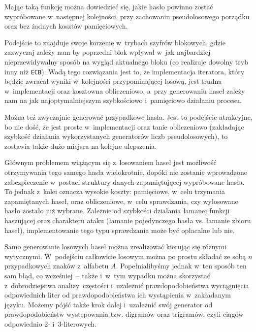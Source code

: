 \begin{myenumerate}
    Mając taką funkcję można dowiedzieć się, jakie hasło powinno zostać
    wypróbowane w~następnej kolejności, przy zachowaniu pseudolosowego porządku
    oraz bez żadnych kosztów pamięciowych.

    Podejście to znajduje swoje korzenie w~trybach szyfrów blokowych, gdzie
    zazwyczaj zależy nam by poprzedni blok wpływał w~jak najbardziej
    nieprzewidywalny sposób na wygląd aktualnego bloku (co realizuje dowolny
    tryb inny niż \texttt{ECB}). Wadą tego rozwiązania jest to, że
    implementacja iteratora, który będzie zwracał wyniki w~kolejności
    przypominającej losową, jest trudna w~implementacji oraz kosztowna
    obliczeniowo, a~przy generowaniu haseł zależy nam na jak najoptymalniejszym
    szybkościowo i~pamięciowo działaniu procesu.

    \item Można też zwyczajnie generować przypadkowe hasła. Jest to podejście
    atrakcyjne, bo nie dość, że jest proste w~implementacji oraz tanie
    obliczeniowo (zakładając szybkość działania wykorzystanych generatorów
    liczb pseudolosowych), to zostawia także dużo miejsca na kolejne
    ulepszenia.

    Głównym problemem wiążącym się z~losowaniem haseł jest możliwość
    otrzymywania tego samego hasła wielokrotnie, dopóki nie zostanie
    wprowadzone zabezpieczenie w~postaci struktury danych zapamiętującej
    wypróbowane hasła. To jednak z~kolei oznacza wysokie koszty: pamięciowe,
    w~celu trzymania zapamiętanych haseł, oraz obliczeniowe, w~celu
    sprawdzania, czy wylosowane hasło zostało już wybrane. Zależnie od
    szybkości działania łamanej funkcji haszującej oraz charakteru ataku
    (łamanie pojedynczego hasła vs. łamanie zbioru haseł), implementowanie tego
    typu sprawdzania może być opłacalne lub nie.

    Samo generowanie losowych haseł można zrealizować kierując się różnymi
    wytycznymi. W~podejściu całkowicie losowym można po prostu składać ze sobą
    $n$ przypadkowych znaków z~alfabetu $A$. Popełnialibyśmy jednak w~ten
    sposób ten sam błąd, co wcześniej~-- także i~w~tym wypadku można skorzystać
    z~dobrodziejstwa analizy~częstości i~uzależnić prawdopodobieństwa
    wyciągnięcia odpowiednich liter od prawdopodobieństwa ich wystąpienia
    w~zakładanym języku. Możemy pójść także krok dalej i~uzależnić swój
    generator od prawdopodobieństw występowania tzw. digramów oraz trigramów,
    czyli ciągów odpowiednio 2- i~3-literowych.


\end{myenumerate}
